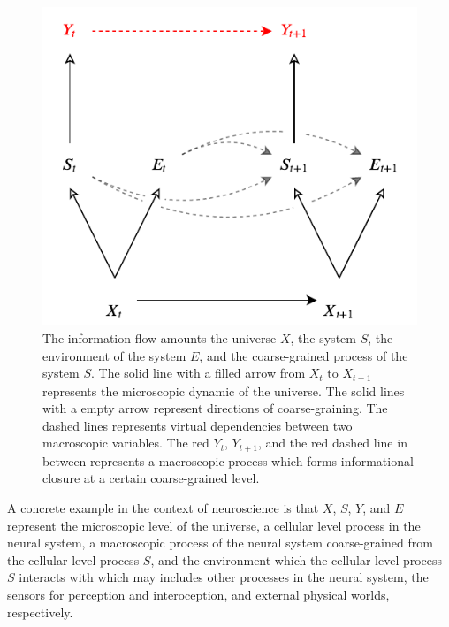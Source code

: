 \documentclass[utf8]{article}
\begin{document}
		\begin{figure}[H]
		    \centering
			\includegraphics[width=\textwidth]{WritingMaterials/Fig_FullGraph/FullGraph.pdf}
			\caption{The information flow amounts the universe $X$, the system $S$, the environment of the system $E$, and the coarse-grained process of the system $S$. The solid line with a filled arrow from $X_t$ to $X_{t+1}$ represents the microscopic dynamic of the universe. The solid lines with a empty arrow represent directions of coarse-graining. The dashed lines represents virtual dependencies between  two macroscopic variables. The red $Y_t$, $Y_{t+1}$, and the red dashed line in between represents a macroscopic process which forms informational closure at a certain coarse-grained level.}
			\label{fig:fullgraph}
	   	\end{figure}
       
        A concrete example in the context of neuroscience is that $X$, $S$, $Y$, and $E$ represent the microscopic level of the universe, a cellular level process in the neural system, a macroscopic process of the neural system coarse-grained from the cellular level process $S$, and the environment which the cellular level process $S$ interacts with which may includes other processes in the neural system, the sensors for perception and interoception, and external physical worlds, respectively.	   	
        
\end{document}
